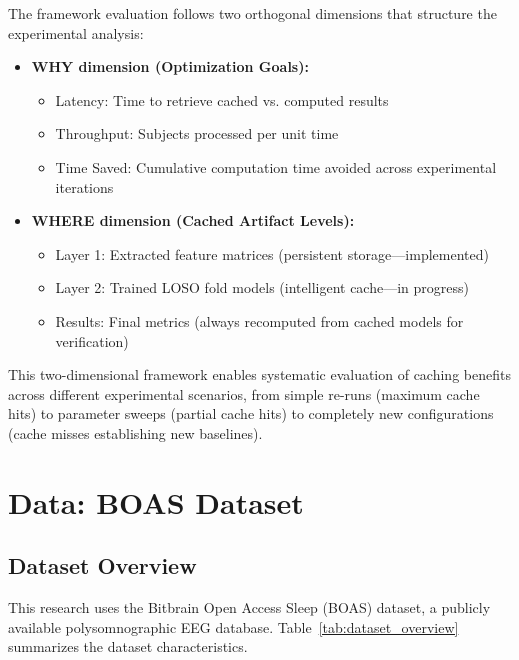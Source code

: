 \documentclass{imc-inf} %
\begin{document}
The framework evaluation follows two orthogonal dimensions that structure the experimental analysis:

\begin{itemize}
    \item \textbf{WHY dimension (Optimization Goals):}
    \begin{itemize}
        \item Latency: Time to retrieve cached vs. computed results
        \item Throughput: Subjects processed per unit time
        \item Time Saved: Cumulative computation time avoided across experimental iterations
    \end{itemize}
    \item \textbf{WHERE dimension (Cached Artifact Levels):}
    \begin{itemize}
        \item Layer 1: Extracted feature matrices (persistent storage---implemented)
        \item Layer 2: Trained LOSO fold models (intelligent cache---in progress)
        \item Results: Final metrics (always recomputed from cached models for verification)
    \end{itemize}
\end{itemize}

This two-dimensional framework enables systematic evaluation of caching benefits across different experimental scenarios, from simple re-runs (maximum cache hits) to parameter sweeps (partial cache hits) to completely new configurations (cache misses establishing new baselines).

\section{Data: BOAS Dataset}

\label{sec:data}

\subsection{Dataset Overview}

This research uses the Bitbrain Open Access Sleep (BOAS) dataset, a publicly available polysomnographic EEG database. Table~\ref{tab:dataset_overview} summarizes the dataset characteristics.
\end{document}
